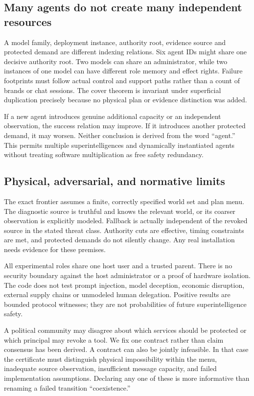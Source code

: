 \documentclass[11pt,a4paper]{article}
\theoremstyle{definition}\newtheorem{definition}{Definition}
\begin{document}
\subsection{Many agents do not create many independent resources}
A model family, deployment instance, authority root, evidence source and protected demand are different indexing relations. Six agent IDs might share one decisive authority root. Two models can share an administrator, while two instances of one model can have different role memory and effect rights. Failure footprints must follow actual control and support paths rather than a count of brands or chat sessions. The cover theorem is invariant under superficial duplication precisely because no physical plan or evidence distinction was added.

If a new agent introduces genuine additional capacity or an independent observation, the success relation may improve. If it introduces another protected demand, it may worsen. Neither conclusion is derived from the word ``agent.'' This permits multiple superintelligences and dynamically instantiated agents without treating software multiplication as free safety redundancy.

\subsection{Physical, adversarial, and normative limits}
The exact frontier assumes a finite, correctly specified world set and plan menu. The diagnostic source is truthful and knows the relevant world, or its coarser observation is explicitly modeled. Fallback is actually independent of the revoked source in the stated threat class. Authority cuts are effective, timing constraints are met, and protected demands do not silently change. Any real installation needs evidence for these premises.

All experimental roles share one host user and a trusted parent. There is no security boundary against the host administrator or a proof of hardware isolation. The code does not test prompt injection, model deception, economic disruption, external supply chains or unmodeled human delegation. Positive results are bounded protocol witnesses; they are not probabilities of future superintelligence safety.

A political community may disagree about which services should be protected or which principal may revoke a tool. We fix one contract rather than claim consensus has been derived. A contract can also be jointly infeasible. In that case the certificate must distinguish physical impossibility within the menu, inadequate source observation, insufficient message capacity, and failed implementation assumptions. Declaring any one of these is more informative than renaming a failed transition ``coexistence.''
\end{document}
